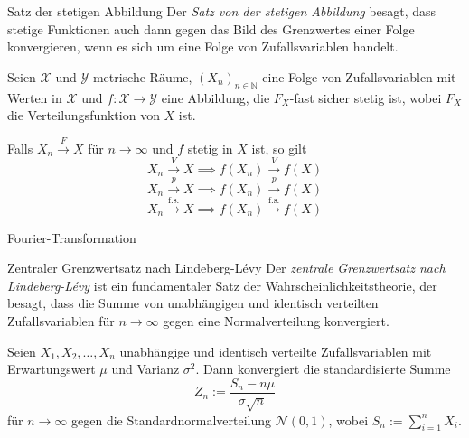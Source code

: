 \begin{bonus}{Satz der stetigen Abbildung}
    Der \emph{Satz von der stetigen Abbildung} besagt, dass stetige Funktionen auch dann gegen das Bild des Grenzwertes einer Folge konvergieren, wenn es sich um eine Folge von Zufallsvariablen handelt.

    Seien $\mathcal{X}$ und $\mathcal{Y}$ metrische Räume, $(X_n)_{n \in \mathbb{N}}$ eine Folge von Zufallsvariablen mit Werten in $\mathcal{X}$ und $f: \mathcal{X} \to \mathcal{Y}$ eine Abbildung, die $F_X$-fast sicher stetig ist, wobei $F_X$ die Verteilungsfunktion von $X$ ist.

    Falls $X_n \xrightarrow{F} X$ für $n \to \infty$ und $f$ stetig in $X$ ist, so gilt
    \[
        X_n \xrightarrow{V} X \implies f(X_n) \xrightarrow{V} f(X)
    \]
    \[
        X_n \xrightarrow{p} X \implies f(X_n) \xrightarrow{p} f(X)
    \]
    \[
        X_n \xrightarrow{\text{f.s.}} X \implies f(X_n) \xrightarrow{\text{f.s.}} f(X)
    \]
\end{bonus}

\begin{bonus}{Fourier-Transformation}

\end{bonus}

\begin{bonus}{Zentraler Grenzwertsatz nach Lindeberg-Lévy}
    Der \emph{zentrale Grenzwertsatz nach Lindeberg-Lévy} ist ein fundamentaler Satz der Wahrscheinlichkeitstheorie, der besagt, dass die Summe von unabhängigen und identisch verteilten Zufallsvariablen für $n \to \infty$ gegen eine Normalverteilung konvergiert.

    Seien $X_1, X_2, \ldots, X_n$ unabhängige und identisch verteilte Zufallsvariablen mit Erwartungswert $\mu$ und Varianz $\sigma^2$. Dann konvergiert die standardisierte Summe
    \[
        Z_n := \frac{S_n - n\mu}{\sigma \sqrt{n}}
    \]
    für $n \to \infty$ gegen die Standardnormalverteilung $\mathcal{N}(0, 1)$, wobei $S_n := \sum_{i=1}^{n} X_i$.
\end{bonus}